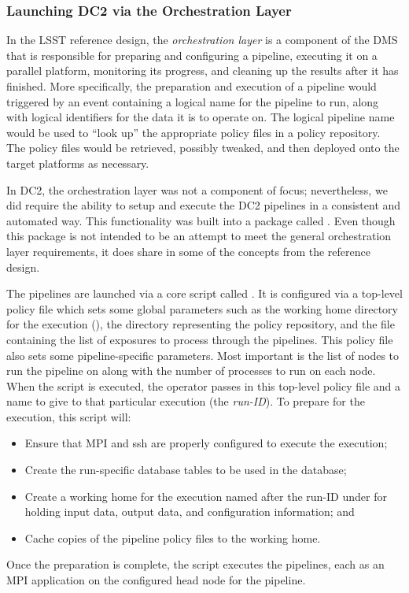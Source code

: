 \subsubsection{Launching DC2 via the Orchestration Layer}\label{sMw-orc}

In the LSST reference design, the \emph{orchestration layer} is a
component of the DMS that is responsible for preparing and configuring
a pipeline, executing it on a parallel platform, monitoring its
progress, and cleaning up the results after it has finished.  More
specifically, the preparation and execution of a pipeline would
triggered by an event containing a logical name for the pipeline to
run, along with logical identifiers for the data it is to operate on.
The logical pipeline name would be used to ``look up'' the appropriate
policy files in a policy repository.  The policy files would be
retrieved, possibly tweaked, and then deployed onto the target
platforms as necessary.  

In DC2, the orchestration layer was not a component of focus;
nevertheless, we did require the ability to setup and execute the DC2
pipelines in a consistent and automated way.  This functionality was
built into a package called .  Even though this
package is not intended to be an attempt to meet the general
orchestration layer requirements, it does share in some of the
concepts from the reference design.  

The pipelines are launched via a core script called .
It is configured via a top-level policy file which sets some global
parameters such as the working home directory for the execution
(), the directory representing the policy
repository, and the file containing the list of exposures to process
through the pipelines.  This policy file also sets some
pipeline-specific parameters.  Most important is the list of nodes to
run the pipeline on along with the number of processes to run on each
node.  When the  script is executed, the operator
passes in this top-level policy file and a name to give to that
particular execution (the \emph{run-ID}).  To prepare for the
execution, this script will: 
\begin{itemize}
\item Ensure that MPI and ssh are properly configured to execute the
execution;
\item Create the run-specific database tables to be used in the
database;  
\item Create a working home for the execution named after the run-ID 
under  for holding input data, output data, and
configuration information; and
\item Cache copies of the pipeline policy files to the working home.
\end{itemize}

Once the preparation is complete, the script executes the pipelines,
each as an MPI application on the configured head node for the
pipeline.  



